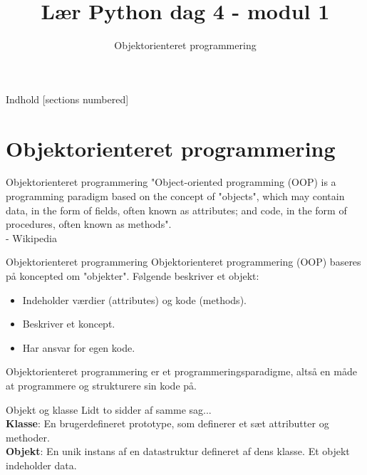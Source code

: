

\title{Lær Python dag 4 - modul 1}
\subtitle{Objektorienteret programmering}



\maketitle

\begin{frame}{Indhold}
  [sections numbered]
  \tableofcontents[hideallsubsections]
\end{frame}


\section{Objektorienteret programmering}
\begin{frame}{Objektorienteret programmering}
	\Large
	"Object-oriented programming (OOP) is a programming paradigm based on the concept of "objects", which may contain data, in the form of fields, often known as attributes; and code, in the form of procedures, often known as methods".\\
	\large
	- Wikipedia
\end{frame}

\begin{frame}{Objektorienteret programmering}
	Objektorienteret programmering (OOP) baseres på koncepted om "objekter". Følgende beskriver et objekt:
	\begin{itemize}
		\item Indeholder værdier (attributes) og kode (methods).
		\item Beskriver et koncept.
		\item Har ansvar for egen kode.
	\end{itemize}
	Objektorienteret programmering er et programmeringsparadigme, altså en måde at programmere og strukturere sin kode på.
\end{frame}

\begin{frame}{Objekt og klasse}
	Lidt to sidder af samme sag...\\
	\bigskip
	\textbf{Klasse}: En brugerdefineret prototype, som definerer et sæt attributter og methoder.\\
	\bigskip
	\textbf{Objekt}: En unik instans af en datastruktur defineret af dens klasse. Et objekt indeholder data.



\end{frame}



